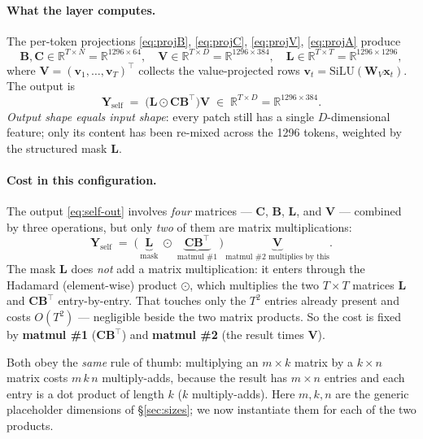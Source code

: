 \documentclass[11pt,a4paper]{article}
\begin{document}
\paragraph{What the layer computes.}
The per-token projections \eqref{eq:projB}, \eqref{eq:projC},
\eqref{eq:projV}, \eqref{eq:projA} produce
\begin{equation}
  \bm{B},\bm{C}\in\mathbb{R}^{T\times N}=\mathbb{R}^{1296\times 64},
  \quad
  \bm{V}\in\mathbb{R}^{T\times D}=\mathbb{R}^{1296\times 384},
  \quad
  \bm{L}\in\mathbb{R}^{T\times T}=\mathbb{R}^{1296\times 1296},
\end{equation}
where $\bm{V} = (\bm{v}_1,\dots,\bm{v}_T)^\top$ collects the
value-projected rows $\bm{v}_t = \mathrm{SiLU}(\bm{W}_V\bm{x}_t)$.
The output is
\begin{equation}
  \bm{Y}_{\text{self}}
   \;=\; \bigl(\bm{L}\odot\bm{C}\bm{B}^\top\bigr)\bm{V}
   \;\in\;\mathbb{R}^{T\times D}=\mathbb{R}^{1296\times 384}.
\end{equation}
\emph{Output shape equals input shape}: every patch still has a single
$D$-dimensional feature; only its content has been re-mixed across the
1296 tokens, weighted by the structured mask $\bm{L}$.

\paragraph{Cost in this configuration.}
The output \eqref{eq:self-out} involves \emph{four} matrices ---
$\bm{C}$, $\bm{B}$, $\bm{L}$, and $\bm{V}$ --- combined by three
operations, but only \emph{two} of them are matrix multiplications:
\begin{equation*}
  \bm{Y}_{\text{self}}
  \;=\;
  \bigl(\,
    \underbrace{\bm{L}}_{\text{mask}}
    \;\odot\;
    \underbrace{\bm{C}\bm{B}^\top}_{\text{matmul \#1}}
  \,\bigr)\,
  \underbrace{\bm{V}}_{\text{matmul \#2 multiplies by this}} .
\end{equation*}
The mask $\bm{L}$ does \emph{not} add a matrix multiplication: it enters
through the Hadamard (element-wise) product $\odot$, which multiplies
the two $T\times T$ matrices $\bm{L}$ and $\bm{C}\bm{B}^\top$
entry-by-entry. That touches only the $T^{2}$ entries already present
and costs $O(T^{2})$ --- negligible beside the two matrix products. So
the cost is fixed by \textbf{matmul \#1} ($\bm{C}\bm{B}^\top$) and
\textbf{matmul \#2} (the result times $\bm{V}$).

Both obey the \emph{same} rule of thumb: multiplying an $m\times k$
matrix by a $k\times n$ matrix costs $m\,k\,n$ multiply-adds, because
the result has $m\times n$ entries and each entry is a dot product of
length $k$ ($k$ multiply-adds). Here $m,k,n$ are the generic
placeholder dimensions of \S\ref{sec:sizes}; we now instantiate them
for each of the two products.
\end{document}
